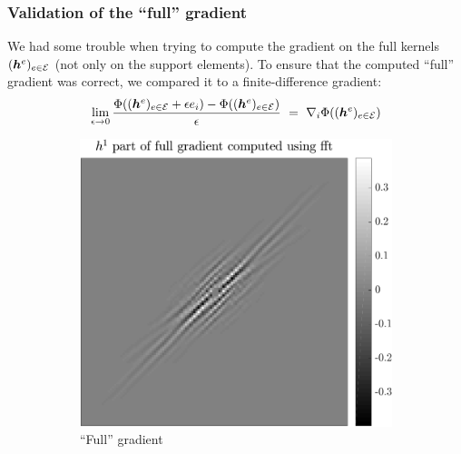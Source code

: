 \subsubsection{Validation of the “full” gradient}
We had some trouble when trying to compute the gradient on the full kernels $(\bm{h}^e)_{e \in \mathcal E}$ (not only on the support elements). To ensure that the computed “full” gradient was correct, we compared it to a finite-difference gradient:
\begin{equation*}\lim_{\epsilon \rightarrow 0} \frac{\Phi((\bm{h}^e)_{e \in \mathcal E}+\epsilon e_i) - \Phi ((\bm{h}^e)_{e \in \mathcal E}) }{\epsilon} ~=~ \nabla_i \Phi ((\bm{h}^e)_{e \in \mathcal E})\end{equation*}

\begin{figure}[!ht]\centering
\begin{subfigure}[b]{0.30\textwidth}\centering
\includegraphics[width=\textwidth]{figures/verif_gradient/gradient.pdf}
\caption{“Full” gradient}\label{fig_verif_gradient-grad}
\end{subfigure}
\begin{subfigure}[b]{0.30\textwidth}\centering

\end{subfigure}
\end{figure}
